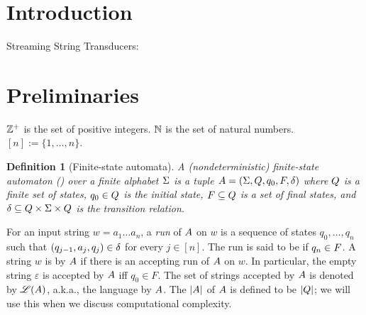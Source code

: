 \documentclass[sigplan,review,anonymous]{acmart}\settopmatter{printfolios=true,printccs=false,printacmref=false}
\newtheorem{definition}{Definition}
\begin{document}




\maketitle


\section{Introduction}

Streaming String Transducers: \cite{FR17}

\section{Preliminaries}

$\mathbb{Z}^+$ is the set of positive integers. $\mathbb{N}$ is the set of natural numbers. $[n]:=\{1, \ldots, n\}$. 

\begin{definition}[Finite-state automata] \label{def:nfa}
	A \emph{(nondeterministic) finite-state automaton}
	(\FA{}) over a finite alphabet $\Sigma$ is a tuple ${A} =
	(\Sigma, Q, q_0, F, \delta)$ where 
	$Q$ is a finite set of 
	states, $q_0\in Q$ is
	the initial state, $F\subseteq Q$ is a set of final states, and 
	$\delta\subseteq Q \times 
	\Sigma \times  Q$ is the
	transition relation. 
\end{definition}

For an input string $w=a_1 \dots a_n$, a \emph{run} of ${A}$ on $w$
is a sequence of states $q_0, \ldots, q_n$ such that $(q_{j-1}, a_{j}, q_{j}) \in
\delta$  for every $j \in [n]$.
The run is said to be  if $q_n \in F$.
A string $w$ is  by ${A}$ if there is an accepting run of
${A}$ on $w$. In particular, the empty string $\varepsilon$ is accepted by ${A}$ iff $q_0 \in F$. The set of strings accepted by ${A}$ is denoted by $\mathscr{L}({A})$,
a.k.a., the language  by ${A}$.
The  $|{A}|$ of ${A}$ is defined to be $|Q|$; we will
use this when we discuss computational complexity.
\end{document}
